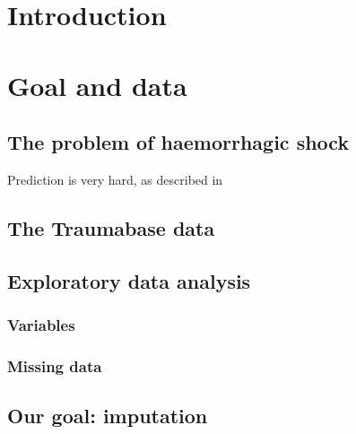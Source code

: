 \documentclass[12pt, a4paper]{memoir}
\begin{document}
\tableofcontents*
\vspace*{\fill}

\chapter*{Introduction}

\chapter{Goal and data}
\label{data}
	\section{The problem of haemorrhagic shock}
	Prediction is very hard, as described in \cite{doctors_prediction}
	\section{The Traumabase data}
	\section{Exploratory data analysis}
		\subsection{Variables}
		\subsection{Missing data}
	\section{Our goal: imputation}
\end{document}
